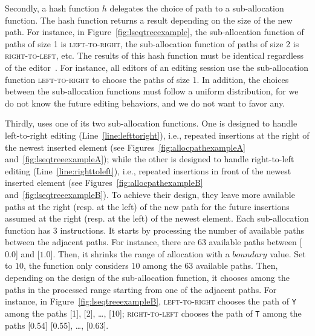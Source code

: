 \noindent Secondly, a hash function $h$ delegates the choice of path to a
sub-allocation function. The hash function returns a result depending on the
size of the new path. For instance, in Figure~\ref{fig:lseqtreeexample}, the
sub-allocation function of paths of size 1 is \textsc{left-to-right}, the
sub-allocation function of paths of size 2 is \textsc{right-to-left}, etc. The
results of this hash function must be identical regardless of the
editor~\cite{nedelec2013concurrency}. For instance, all editors of an editing
session use the sub-allocation function \textsc{left-to-right} to choose the
paths of size 1. In addition, the choices between the sub-allocation functions
must follow a uniform distribution, for we do not know the future editing
behaviors, and we do not want to favor any.




\noindent Thirdly, \LSEQ uses one of its two sub-allocation functions. One is
designed to handle left-to-right editing (Line~\ref{line:lefttoright}), i.e.,
repeated insertions at the right of the newest inserted element (see
Figures~\ref{fig:allocpathexampleA} and~\ref{fig:lseqtreeexampleA}); while the
other is designed to handle right-to-left editing (Line~\ref{line:righttoleft}),
i.e., repeated insertions in front of the newest inserted element (see
Figures~\ref{fig:allocpathexampleB} and~\ref{fig:lseqtreeexampleB}). To achieve
their design, they leave more available paths at the right (resp. at the left)
of the new path for the future insertions assumed at the right (resp. at the
left) of the newest element. Each sub-allocation function has 3 instructions. It
starts by processing the number of available paths between the adjacent
paths. For instance, there are $63$ available paths between [$0.0$] and
[$1.0$]. Then, it shrinks the range of allocation with a $boundary$ value. Set
to $10$, the function only considers $10$ among the $63$ available paths. Then,
depending on the design of the sub-allocation function, it chooses among the
paths in the processed range starting from one of the adjacent paths. For
instance, in Figure~\ref{fig:lseqtreeexampleB}, \textsc{left-to-right} chooses
the path of \texttt{Y} among the paths [1], [2], \ldots, [10];
\textsc{right-to-left} chooses the path of \texttt{T} among the paths [0.54]
[0.55], \ldots, [0.63].

